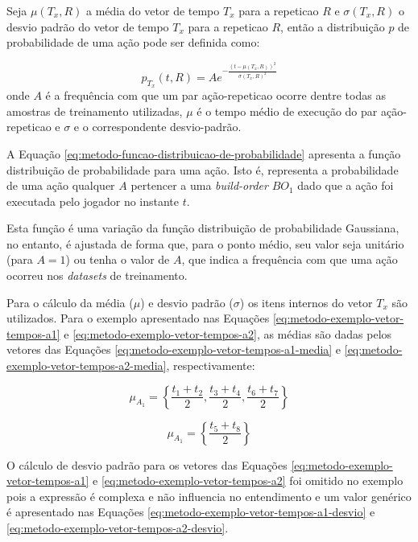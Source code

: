 Seja $\mu(T_x, R)$ a média do vetor de tempo $T_x$ para a \gls{repeticao} $R$ e $\sigma(T_x, R)$ o desvio padrão do vetor de tempo $T_x$ para a \gls{repeticao} $R$, então a distribuição $p$ de probabilidade de uma ação pode ser definida como:

\begin{equation}
	p_{T_x}(t, R) = A e^{-\frac{(t-\mu(T_x, R))^2}{{\sigma(T_x, R)}^2}}
	\label{eq:metodo-funcao-distribuicao-de-probabilidade}
\end{equation}
\noindent onde $A$ é a frequência com que um par ação-\gls{repeticao} ocorre dentre todas as amostras de treinamento utilizadas, $\mu$ é o tempo médio de execução do par ação-\gls{repeticao} e $\sigma$ e o correspondente desvio-padrão.

A Equação \ref{eq:metodo-funcao-distribuicao-de-probabilidade} apresenta a função distribuição de probabilidade para uma ação. Isto é, representa a probabilidade de uma ação qualquer $A$ pertencer a uma \textit{\gls{build-order}} $BO_1$ dado que a ação foi executada pelo jogador no instante $t$.

Esta função é uma variação da função distribuição de probabilidade Gaussiana, no entanto, é ajustada de forma que, para o ponto médio, seu valor seja unitário (para $A=1$) ou tenha o valor de $A$, que indica a frequência com que uma ação ocorreu nos \textit{datasets} de treinamento.

Para o cálculo da média ($\mu$) e desvio padrão ($\sigma$) os itens internos do vetor $T_x$ são utilizados. Para o exemplo apresentado nas Equações \ref{eq:metodo-exemplo-vetor-tempos-a1} e \ref{eq:metodo-exemplo-vetor-tempos-a2}, as médias são dadas pelos vetores das Equações \ref{eq:metodo-exemplo-vetor-tempos-a1-media} e \ref{eq:metodo-exemplo-vetor-tempos-a2-media}, respectivamente:

\begin{equation}
    \mu_{A_1} = \left\{
		\frac{t_1 + t_2}{2}, 
		\frac{t_3 + t_4}{2}, 		
		\frac{t_6 + t_7}{2}
	\right\}
	\label{eq:metodo-exemplo-vetor-tempos-a1-media}
\end{equation}

\begin{equation}
    \mu_{A_1} = \left\{
		\frac{t_5 + t_8}{2}
	\right\}
	\label{eq:metodo-exemplo-vetor-tempos-a2-media}
\end{equation}

O cálculo de desvio padrão para os vetores das Equações \ref{eq:metodo-exemplo-vetor-tempos-a1} e \ref{eq:metodo-exemplo-vetor-tempos-a2} foi omitido no exemplo pois a expressão é complexa e não influencia no entendimento e um valor genérico é apresentado nas Equações \ref{eq:metodo-exemplo-vetor-tempos-a1-desvio} e \ref{eq:metodo-exemplo-vetor-tempos-a2-desvio}.

